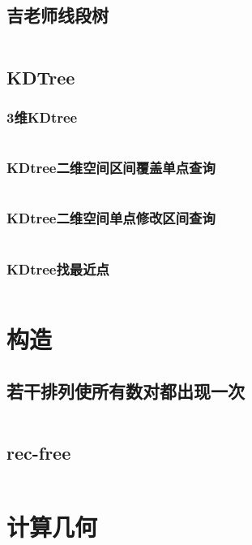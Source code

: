 \documentclass{article}
\begin{document}
\subsection{吉老师线段树}
\inputminted[breaklines]{c++}{../数据结构/吉老师线段树.cpp}

\subsection{KDTree}
\subsubsection{3维KDtree}
\inputminted[breaklines]{c++}{../数据结构/3维KDtree.cpp}

\subsubsection{KDtree二维空间区间覆盖单点查询}
\inputminted[breaklines]{c++}{../数据结构/KDtree二维空间区间覆盖单点查询.cpp}

\subsubsection{KDtree二维空间单点修改区间查询}
\inputminted[breaklines]{c++}{../数据结构/KDtree二维空间单点修改区间查询.cpp}

\subsubsection{KDtree找最近点}
\inputminted[breaklines]{c++}{../数据结构/KDtree找最近点.cpp}

\newpage
\section{构造}
\subsection{若干排列使所有数对都出现一次}
\inputminted[breaklines]{c++}{../构造/若干排列使所有数对都出现一次.cpp}

\subsection{rec-free}
\inputminted[breaklines]{c++}{../构造/rec-free.cpp}

\newpage
\section{计算几何}
\end{document}
